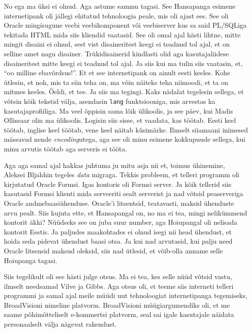 No ega ma üksi ei olnud. Aga astume sammu tagasi. See Hansapanga esimene 
internetipank oli jällegi ehitatud tehnoloogia peale, mis oli ajast ees. See 
oli Oracle mingisugune veebi veebikomponent või veebiserver kus 
sa said PL/SQLiga tekitada HTML mida siis kliendid 
vaatasid. See oli omal ajal hästi lihtne, mitte mingit disaini ei olnud, sest 
vist disaineritest keegi ei teadnud tol ajal, et on selline amet nagu disainer. 
Trükidisainerid kindlasti olid aga kasutajaliidese disaineritest mitte keegi ei 
teadnud tol ajal. Ja siis kui ma tulin siis vaatasin, et, \enquote{oo milline 
ebavõrdsus!}. Et et see internetipank on ainult eesti keeles. Kohe ütlesin, et 
noh, mis ta siin teha on, ma võin näiteks teha niimoodi, et ta on 
mitmes keeles. Öeldi, et tee. Ja siis ma tegingi. Kaks nädalat tegelesin 
sellega, et võtsin kõik tekstid välja, asendasin \verb|lang| funktsiooniga, mis 
arvestas ka kasutajaprofiiliga. Ma veel õppisin sama lõik ülikoolis, ja see 
päev, kui Madis Ollissaar olin ma ülikoolis. 
Logisin siis sisse, et vaadata, kas töötab. Eesti keel töötab, inglise keel 
töötab, vene keel näitab küsimärke. Ilmselt siiamaani inimesed mässavad nende 
\emph{encoding}utega, aga see oli minu esimene kokkupuude sellega, kui minu 
arvutis töötab aga serveris ei tööta.

Aga aga samal ajal hakkas juhtuma ju mitu asja nii et, toimus ühinemine, 
Aleksei Bljahhin tegeles \emph{data} migraga. 
Tekkis probleem, et telleri programm oli kirjutatud Oracle Formsi. Igas 
kontoris oli Formsi server. Ja kõik tellerid siis kasutasid Formsi klienti mida 
serveeriti sealt serverist ja nad võtsid peaserveriga Oracle 
andmebaasiühenduse. Oracle'i litsentsid, teatavasti, maksid ühenduste arvu 
pealt. Siis kujuta ette, et Hansapangal on, no ma ei tea, mingi nelikümmend 
kontorit äkki? Nüüdseks see on juba suur number, aga Hoiupangal oli nelisada 
kontorit Eestis. Ja paljudes maakohtades ei olnud isegi nii head ühendust, et 
hoida seda pidevat ühendust baasi otsa. Ja kui nad arvutasid, kui palju need 
Oracle litsensid maksud oleksid, siis nad ütlesid, et võib-olla anname selle 
Hoiupanga tagasi. 

Siis tegelikult oli see hästi julge otsus. Ma ei tea, kes selle nüüd võtsid 
vastu, ilmselt needsamad Vilve ja 
Gibbs. Aga otsus oli, et teeme siis 
interneti telleri programmi ja samal ajal meile müüdi uut tehnoloogiat 
internetipanga tegemiseks, BroadVisioni nimeline platvorm. 
BroadVisioni müügiargumendiks oli, et me saame põhimõtteliselt e-kommertsi 
platvorm,  seal sai igale kasutajale näidata personaalselt välja nägevat 
rakendust.

